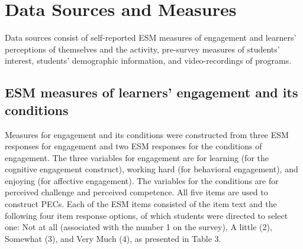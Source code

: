 \documentclass[]{msu-thesis}
\theoremstyle{definition}
\theoremstyle{definition}
\theoremstyle{definition}
\theoremstyle{remark}
\begin{document}
\section{Data Sources and Measures}\label{data-sources-and-measures}

Data sources consist of self-reported ESM measures of engagement and
learners' perceptions of themselves and the activity, pre-survey
measures of students' interest, students' demographic information, and
video-recordings of programs.

\subsection{ESM measures of learners' engagement and its
conditions}\label{esm-measures-of-learners-engagement-and-its-conditions}

Measures for engagement and its conditions were constructed from three
ESM responses for engagement and two ESM responses for the conditions of
engagement. The three variables for engagement are for learning (for the
cognitive engagement construct), working hard (for behavioral
engagement), and enjoying (for affective engagement). The variables for
the conditions are for perceived challenge and perceived competence. All
five items are used to construct PECs. Each of the ESM items consisted
of the item text and the following four item response options, of which
students were directed to select one: Not at all (associated with the
number 1 on the survey), A little (2), Somewhat (3), and Very Much (4),
as presented in Table 3.

\begin{table}

\caption{\label{tab:unnamed-chunk-5}ESM measures for profiles of engagement and its conditions (PECs)}
\centering
{}
\end{table}
\end{document}
